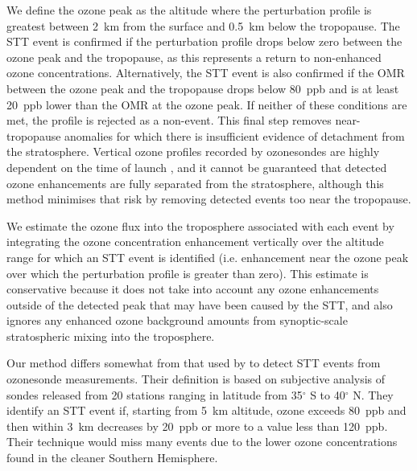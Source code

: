 \documentclass[acp, manuscript]{copernicus} %
\begin{document}
    We define the ozone peak as the altitude where the perturbation profile is greatest between 2~km from the surface and 0.5~km below the tropopause.
    The STT event is confirmed if the perturbation profile drops below zero between the ozone peak and the tropopause, as this represents a return to non-enhanced ozone concentrations.
    Alternatively, the STT event is also confirmed if the OMR between the ozone peak and the tropopause drops below 80~ppb and is at least 20~ppb lower than the OMR at the ozone peak. 
    If neither of these conditions are met, the profile is rejected as a non-event.
    This final step removes near-tropopause anomalies for which there is insufficient evidence of detachment from the stratosphere.
    Vertical ozone profiles recorded by ozonesondes are highly dependent on the time of launch \citep{Sprenger2003}, and it cannot be guaranteed that detected ozone enhancements are fully separated from the stratosphere, although this method minimises that risk by removing detected events too near the tropopause.

    We estimate the ozone flux into the troposphere associated with each event by integrating the ozone concentration enhancement vertically over the altitude range for which an STT event is identified (i.e. enhancement near the ozone peak over which the perturbation profile is greater than zero).
    This estimate is conservative because it does not take into account any ozone enhancements outside of the detected peak that may have been caused by the STT, and also ignores any enhanced ozone background amounts from synoptic-scale stratospheric mixing into the troposphere.
    
    Our method differs somewhat from that used by \citet{Tang2010} to detect STT events from ozonesonde measurements. 
    Their definition is based on subjective analysis of sondes released from 20 stations ranging in latitude from 35$^\circ$ S to 40$^\circ$ N.
    They identify an STT event if, starting from 5~km altitude, ozone exceeds 80~ppb and then within 3~km decreases by 20~ppb or more to a value less than 120~ppb.
    Their technique would miss many events due to the lower ozone concentrations found in the cleaner Southern Hemisphere.
\end{document}
